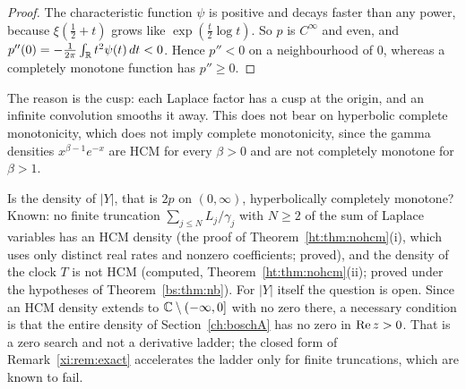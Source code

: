 \begin{proof}
The characteristic function $\psi$ is positive and decays faster than any power, because $\xi(\frac12+t)$ grows like $\exp(\frac t2\log t)$. So $p$ is $C^\infty$ and even, and $p''(0)=-\frac1{2\pi}\int_{\mathbb{R}} t^2\psi(t)\,dt<0$. Hence $p''<0$ on a neighbourhood of $0$, whereas a completely monotone function has $p''\ge0$.
\end{proof}

The reason is the cusp: each Laplace factor has a cusp at the origin, and an infinite convolution smooths it away. This does not bear on hyperbolic complete monotonicity, which does not imply complete monotonicity, since the gamma densities $x^{\beta-1}e^{-x}$ are HCM for every $\beta>0$ and are not completely monotone for $\beta>1$.

\begin{problem}\label{xi:prob:hcm}
Is the density of $|Y|$, that is $2p$ on $(0,\infty)$, hyperbolically completely monotone? Known: no finite truncation $\sum_{j\le N}L_j/\gamma_j$ with $N\ge2$ of the sum of Laplace variables has an HCM density (the proof of Theorem~\ref{ht:thm:nohcm}(i), which uses only distinct real rates and nonzero coefficients; proved), and the density of the clock $T$ is not HCM (computed, Theorem~\ref{ht:thm:nohcm}(ii); proved under the hypotheses of Theorem~\ref{bs:thm:nb}). For $|Y|$ itself the question is open. Since an HCM density extends to $\mathbb{C}\setminus(-\infty,0]$ with no zero there, a necessary condition is that the entire density of Section~\ref{ch:boschA} has no zero in $\operatorname{Re} z>0$. That is a zero search and not a derivative ladder; the closed form of Remark~\ref{xi:rem:exact} accelerates the ladder only for finite truncations, which are known to fail.
\end{problem}
